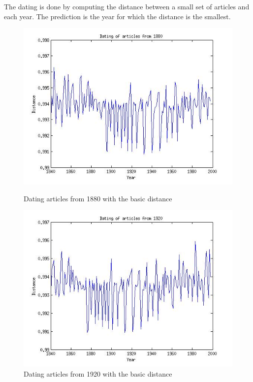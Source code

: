The dating is done by computing the distance between a small set of articles and each year. The prediction is the year for which the distance is the smallest.

\begin{figure}[H]
    \begin{minipage}[b]{0.3\linewidth}
        \includegraphics[scale=0.25]{Pictures/date_articles/distance1/dating1880.jpg}
        \caption{Dating articles from 1880 with the basic distance}
    \end{minipage}\hfill
    \begin{minipage}[b]{0.3\linewidth}
        \includegraphics[scale=0.25]{Pictures/date_articles/distance1/dating1920.jpg}
        \caption{Dating articles from 1920 with the basic distance}

\end{minipage}
\end{figure}
